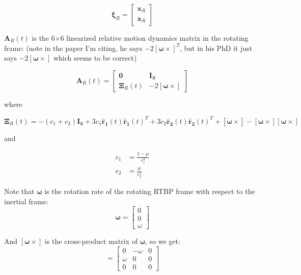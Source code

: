 \documentclass[]{article}
\begin{document}
\begin{equation*}
\boldsymbol{\xi}_R = \begin{bmatrix}
									\mathbf{x}_R \\
									\dot{\mathbf{x}}_R
									\end{bmatrix}
\end{equation*}

\(\mathbf{A}_R(t)\) is the 6\(\times\)6 linearized relative motion dynamics matrix in the rotating frame: (note in the paper I'm citing, he says \(-2 [\boldsymbol{\omega} \times]^T\), but in his PhD it just says \(-2 [\boldsymbol{\omega} \times]\) which seems to be correct)

\begin{equation} \label{eq:RelmoDynMatrix}
\mathbf{A}_R(t) = \begin{bmatrix}
								\mathbf{0}          & \mathbf{I_3} \\
								\mathbf{\Xi}_R(t) & -2 [\boldsymbol{\omega} \times]
								\end{bmatrix}
\end{equation}

where

\begin{equation*}
\mathbf{\Xi}_R(t) = -(c_1 + c_2)\mathbf{I_3} 
								+ 3c_1\mathbf{\hat{r}_1}(t) \mathbf{\hat{r}_1}(t)^T 
								+ 3c_2\mathbf{\hat{r}_2}(t) \mathbf{\hat{r}_2}(t)^T 
								+ [\boldsymbol{\dot{\omega}} \times] 
								- [\boldsymbol{\omega}\times][\boldsymbol{\omega}\times]
\end{equation*}

and

\begin{equation*}
\begin{aligned}
c_1 &= \frac{1- \mu}{r_1^3} \\
c_2 &= \frac{\mu}{r_2^3}
\end{aligned}
\end{equation*}

Note that \(\boldsymbol{\omega}\) is the rotation rate of the rotating RTBP frame with respect to the inertial frame:
\begin{equation*}
\boldsymbol{\omega} = \begin{bmatrix}
					0 \\ 
					0 \\
					\omega
					\end{bmatrix}
\end{equation*}

And  \([\boldsymbol{\omega}\times]\) is the cross-product matrix of \(\boldsymbol{\omega}\), so we get:
\begin{equation*}
[\boldsymbol{\omega}\times] = \begin{bmatrix}
								0           & -\omega & 0 \\ 
								\omega & 0             & 0 \\
								0           & 0             & 0
								\end{bmatrix}
\end{equation*}
\end{document}

